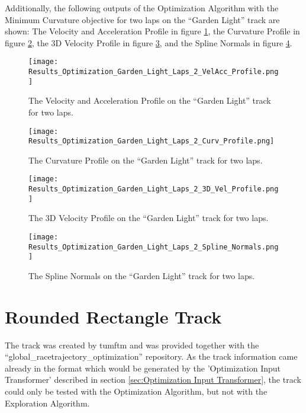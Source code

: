 Additionally, the following outputs of the Optimization Algorithm with the Minimum Curvature objective for two laps on the ``Garden Light'' track are shown: The Velocity and Acceleration Profile in figure \ref{fig:Results Garden Light Laps 2 VelAcc Profile}, the Curvature Profile in figure \ref{fig:Results Garden Light Laps 2 Curv Profile}, the 3D Velocity Profile in figure \ref{fig:Results Garden Light Laps 2 3D Vel Profile}, and the Spline Normals in figure \ref{fig:Results Garden Light Laps 2 Spline Normals}.
\begin{figure}[H]
    \centering
    \texttt{[image: Results\_Optimization\_Garden\_Light\_Laps\_2\_VelAcc\_Profile.png]}
    \caption{The Velocity and Acceleration Profile on the ``Garden Light'' track for two laps.}
    \label{fig:Results Garden Light Laps 2 VelAcc Profile}
\end{figure}
\begin{figure}[H]
    \centering
    \texttt{[image: Results\_Optimization\_Garden\_Light\_Laps\_2\_Curv\_Profile.png]}
    \caption{The Curvature Profile on the ``Garden Light'' track for two laps.}
    \label{fig:Results Garden Light Laps 2 Curv Profile}
\end{figure}
\begin{figure}[H]
    \centering
    \texttt{[image: Results\_Optimization\_Garden\_Light\_Laps\_2\_3D\_Vel\_Profile.png]}
    \caption{The 3D Velocity Profile on the ``Garden Light'' track for two laps.}
    \label{fig:Results Garden Light Laps 2 3D Vel Profile}
\end{figure}
\begin{figure}[H]
    \centering
    \texttt{[image: Results\_Optimization\_Garden\_Light\_Laps\_2\_Spline\_Normals.png]}
    \caption{The Spline Normals on the ``Garden Light'' track for two laps.}
    \label{fig:Results Garden Light Laps 2 Spline Normals}
\end{figure}

\pagebreak

\section{Rounded Rectangle Track} \label{sec:Results Rounded Rectangle Track}
The track was created by \acrshort{tumftm} and was provided together with the ``global\_racetrajectory\_optimization'' repository. \cite{tumftm_optimization_algoritm}
As the track information came already in the format which would be generated by the 'Optimization Input Transformer' described in section \ref{sec:Optimization Input Transformer}, the track could only be tested with the Optimization Algorithm, but not with the Exploration Algorithm.

